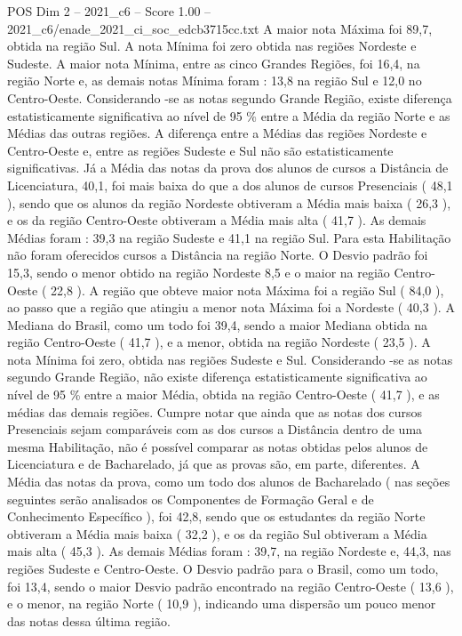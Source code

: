 \begin{textsample}{POS Dim 2 – 2021\_c6 – Score 1.00 – 2021\_c6/enade\_2021\_ci\_soc\_edcb3715cc.txt}
A maior nota Máxima foi 89,7, obtida na região Sul.
A nota Mínima foi zero obtida nas regiões Nordeste e Sudeste.
A maior nota Mínima, entre as cinco Grandes Regiões, foi 16,4, na região Norte e, as demais notas Mínima foram : 13,8 na região Sul e 12,0 no Centro-Oeste.
Considerando -se as notas segundo Grande Região, existe diferença estatisticamente significativa ao nível de 95 \% entre a Média da região Norte e as Médias das outras regiões.
A diferença entre a Médias das regiões Nordeste e Centro-Oeste e, entre as regiões Sudeste e Sul não são estatisticamente significativas.
Já a Média das notas da prova dos alunos de cursos a Distância de Licenciatura, 40,1, foi mais baixa do que a dos alunos de cursos Presenciais ( 48,1 ), sendo que os alunos da região Nordeste obtiveram a Média mais baixa ( 26,3 ), e os da região Centro-Oeste obtiveram a Média mais alta ( 41,7 ).
As demais Médias foram : 39,3 na região Sudeste e 41,1 na região Sul.
Para esta Habilitação não foram oferecidos cursos a Distância na região Norte.
O Desvio padrão foi 15,3, sendo o menor obtido na região Nordeste 8,5 e o maior na região Centro-Oeste ( 22,8 ).
A região que obteve maior nota Máxima foi a região Sul ( 84,0 ), ao passo que a região que atingiu a menor nota Máxima foi a Nordeste ( 40,3 ).
A Mediana do Brasil, como um todo foi 39,4, sendo a maior Mediana obtida na região Centro-Oeste ( 41,7 ), e a menor, obtida na região Nordeste ( 23,5 ).
A nota Mínima foi zero, obtida nas regiões Sudeste e Sul.
Considerando -se as notas segundo Grande Região, não existe diferença estatisticamente significativa ao nível de 95 \% entre a maior Média, obtida na região Centro-Oeste ( 41,7 ), e as médias das demais regiões.
Cumpre notar que ainda que as notas dos cursos Presenciais sejam comparáveis com as dos cursos a Distância dentro de uma mesma Habilitação, não é possível comparar as notas obtidas pelos alunos de Licenciatura e de Bacharelado, já que as provas são, em parte, diferentes.
A Média das notas da prova, como um todo dos alunos de Bacharelado ( nas seções seguintes serão analisados os Componentes de Formação Geral e de Conhecimento Específico ), foi 42,8, sendo que os estudantes da região Norte obtiveram a Média mais baixa ( 32,2 ), e os da região Sul obtiveram a Média mais alta ( 45,3 ).
As demais Médias foram : 39,7, na região Nordeste e, 44,3, nas regiões Sudeste e Centro-Oeste.
O Desvio padrão para o Brasil, como um todo, foi 13,4, sendo o maior Desvio padrão encontrado na região Centro-Oeste ( 13,6 ), e o menor, na região Norte ( 10,9 ), indicando uma dispersão um pouco menor das notas dessa última região.

\end{textsample}
